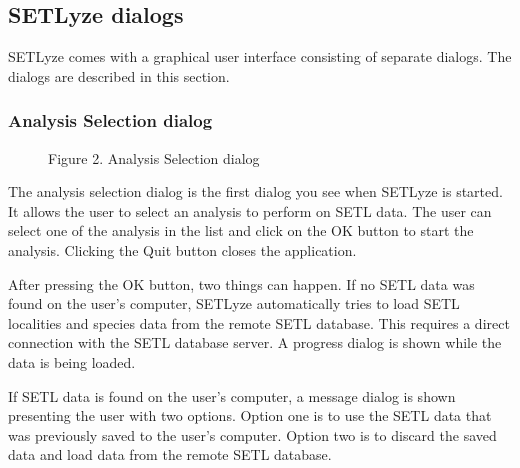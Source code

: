 \documentclass[letterpaper,10pt,english]{sphinxmanual}
\begin{document}
\subsection{SETLyze dialogs}
\label{user_manual:setlyze-dialogs}\label{user_manual:id1}
SETLyze comes with a graphical user interface consisting of separate
dialogs. The dialogs are described in this section.


\subsubsection{Analysis Selection dialog}
\label{user_manual:analysis-selection-dialog}\label{user_manual:dialog-analysis-selection}\begin{figure}[htbp]
\centering
\capstart

\caption{Figure 2. Analysis Selection dialog}\end{figure}

The analysis selection dialog is the first dialog you see when SETLyze
is started. It allows the user to select an analysis to perform on SETL
data. The user can select one of the analysis in the list and click on
the OK button to start the analysis. Clicking the Quit button closes
the application.

After pressing the OK button, two things can happen. If no SETL data was
found on the user's computer, SETLyze automatically tries to load SETL
localities and species data from the remote SETL database. This requires
a direct connection with the SETL database server. A progress dialog is
shown while the data is being loaded.

If SETL data is found on the user's computer, a message dialog is shown
presenting the user with two options. Option one is to use the SETL data
that was previously saved to the user's computer. Option two is to
discard the saved data and load data from the remote SETL database.
\end{document}
